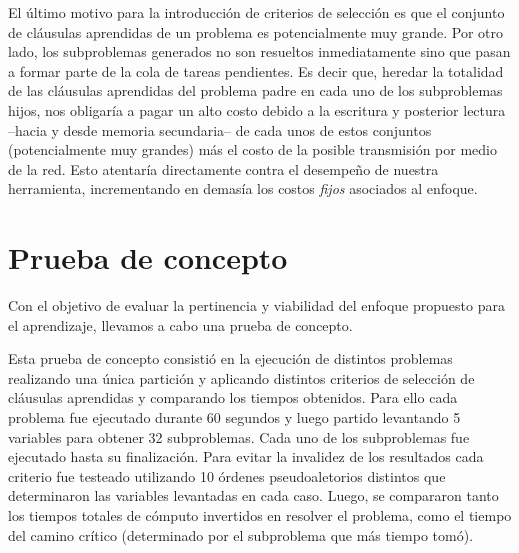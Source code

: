 El último motivo para la introducción de criterios de selección es que el
conjunto de cláusulas aprendidas de un problema es potencialmente muy grande.
Por otro lado, los subproblemas generados no son resueltos inmediatamente sino
que pasan a formar parte de la cola de tareas pendientes. Es decir que,
heredar la totalidad de las cláusulas aprendidas del problema padre en cada
uno de los subproblemas hijos, nos obligaría a pagar un alto costo debido a la
escritura y posterior lectura --hacia y desde memoria secundaria-- de cada
unos de estos conjuntos (potencialmente muy grandes) más el costo de la
posible transmisión por medio de la red. Esto atentaría directamente contra el
desempeño de nuestra herramienta, incrementando en demasía los costos
\emph{fijos} asociados al enfoque.




\section{Prueba de concepto}

Con el objetivo de evaluar la pertinencia y viabilidad del enfoque propuesto
para el aprendizaje, llevamos a cabo una prueba de concepto. 


Esta prueba de concepto consistió en la ejecución de distintos problemas
realizando una única partición y aplicando distintos criterios de selección de
cláusulas aprendidas y comparando los tiempos obtenidos. Para ello cada
problema fue ejecutado durante 60 segundos y luego partido levantando 5
variables para obtener 32 subproblemas. Cada uno de los subproblemas fue
ejecutado hasta su finalización. Para evitar la invalidez de los resultados
cada criterio fue testeado utilizando 10 órdenes pseudoaletorios distintos que
determinaron las variables levantadas en cada caso. Luego, se compararon tanto
los tiempos totales de cómputo invertidos en resolver el problema, como el
tiempo del camino crítico (determinado por el subproblema que más tiempo tomó).


